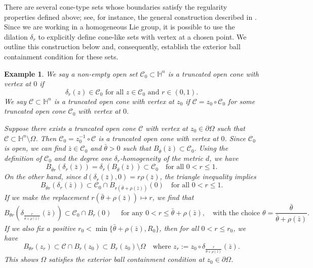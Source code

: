 \documentclass[12pt]{amsart}
\newtheorem{Example}[Theorem]{Example}
\def \Hn {{\mathbb H}^n}
\def \O {\Omega}
\begin{document}
There are several cone-type sets whose boundaries satisfy the regularity properties defined above; see, for instance, the general construction described in \cite[Theorem 6.5]{LU2010}. Since we are working in a homogeneous Lie group, it is possible to use the dilation $\delta_r$ to explicitly define cone-like sets with vertex at a chosen point. We outline this construction below and, consequently, establish the exterior ball containment condition for these sets.

\begin{Example}\label{exa:exterior-cone}
We say a non-empty open set $\mathcal{C}_0\subset \Hn$ is \emph{a truncated open cone with vertex at $0$} if
$$
\delta_r(z)\in \mathcal{C}_0 \text{ for all } z\in
\mathcal{C}_0 \text{ and } r\in (0,1).$$
We say $\mathcal{C}\subset \Hn$ is a \emph{truncated open cone with vertex at $z_0$} if $\mathcal{C}=z_0\circ \mathcal{C}_0$ for some truncated open cone $\mathcal{C}_0$ with vertex at $0$.

Suppose there exists a truncated open cone $\mathcal{C}$ with vertex at $z_0 \in \partial \O$ such that $\mathcal{C}\subset \Hn\setminus \O$. Then $\mathcal{C}_0=z_0^{-1}\circ \mathcal{C}$ is a truncated open cone with vertex at $0$. Since $\mathcal{C}_0$ is open, we can find $\bar{z}\in \mathcal{C}_0$ and $\bar{\theta}>0$ such that $B_{\bar{\theta}}(\bar{z})\subset \mathcal{C}_0$. Using the definition of $\mathcal{C}_0$ and the degree one $\delta_r$-homogeneity of the metric $d$, we have 
\[B_{\bar{\theta} r}(\delta_r(\bar{z}))=\delta_r\left( B_{\bar{\theta}}(\bar{z}) \right)\subset \mathcal{C}_0 \quad \text{for all } 0<r\leq 1.\] 
On the other hand, since $d(\delta_{r}(\bar{z}),0)=r\rho(\bar{z})$, the triangle inequality implies \[B_{\bar{\theta}r}(\delta_r(\bar{z}))\subset \mathcal{C}_0\cap B_{r(\bar{\theta}+\rho(\bar{z}))}(0) \quad \text{for all } 0<r\leq 1.
\]
If we make the replacement $r(\bar{\theta}+\rho(\bar{z}))\mapsto r$, we find that
\[
B_{\theta r}\left(\delta_{\frac{r}{\bar{\theta}+\rho(\bar{z})}}(\bar{z})\right)\subset \mathcal{C}_0\cap B_{r}(0)\quad\mbox{ for any }0<r\leq \bar{\theta}+\rho(\bar{z}), \quad\mbox{with the choice }\theta=\frac{\bar{\theta}}{\bar{\theta}+\rho(\bar{z})}.
\]
If we also fix a positive $r_0<\min\{\bar{\theta}+\rho(\bar{z}), R_0\}$, then for all $0<r\leq r_0$, we have
\[
B_{\theta r}(z_r)\subset\mathcal{C}\cap B_{r}(z_0)\subset B_{r}(z_0)\setminus \O \quad \text{where } z_r:=z_0\circ \delta_{\frac{r}{\bar{\theta}+\rho(\bar{z})}}(\bar{z}).
\]
This shows $\O$ satisfies the exterior ball containment condition at $z_0 \in \partial \O$.
\end{Example}
\end{document}
